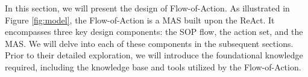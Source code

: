 


    





In this section, we will present the design of Flow-of-Action. As illustrated in Figure \ref{fig:model}, the Flow-of-Action is a MAS built upon the ReAct. It encompasses three key design components: the SOP flow, the action set, and the MAS. We will delve into each of these components in the subsequent sections. Prior to their detailed exploration, we will introduce the foundational knowledge required, including the knowledge base and tools utilized by the Flow-of-Action.

